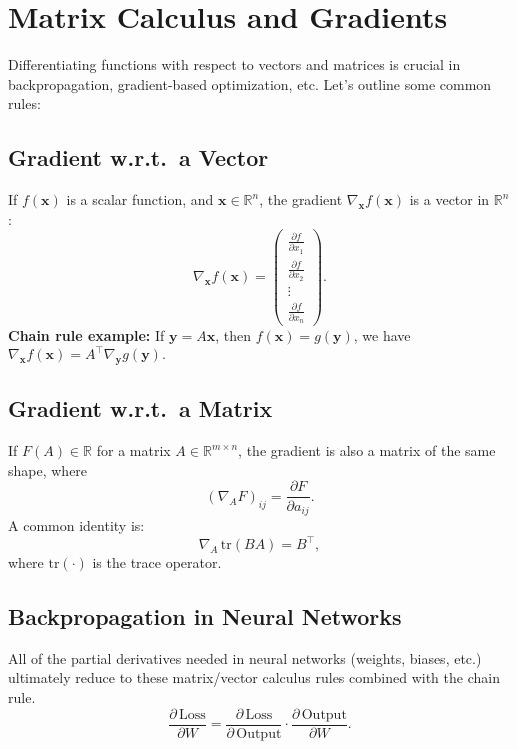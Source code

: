 \section{Matrix Calculus and Gradients}
Differentiating functions with respect to vectors and matrices is crucial in backpropagation, 
gradient-based optimization, etc. Let’s outline some common rules:

\subsection{Gradient w.r.t.\ a Vector}
If $f(\mathbf{x})$ is a scalar function, and $\mathbf{x} \in \mathbb{R}^n$, 
the gradient $\nabla_{\mathbf{x}} f(\mathbf{x})$ is a vector in $\mathbb{R}^n$:
\[
\nabla_{\mathbf{x}} f(\mathbf{x})
= \begin{pmatrix}
\frac{\partial f}{\partial x_1} \\
\frac{\partial f}{\partial x_2} \\
\vdots \\
\frac{\partial f}{\partial x_n}
\end{pmatrix}.
\]
\textbf{Chain rule example:} If $\mathbf{y} = A \mathbf{x}$, then $f(\mathbf{x}) = g(\mathbf{y})$, 
we have $\nabla_{\mathbf{x}} f(\mathbf{x}) = A^\top \nabla_{\mathbf{y}} g(\mathbf{y}).$

\subsection{Gradient w.r.t.\ a Matrix}
If $F(A) \in \mathbb{R}$ for a matrix $A \in \mathbb{R}^{m \times n}$, 
the gradient is also a matrix of the same shape, where
\[
(\nabla_A F)_{ij} = \frac{\partial F}{\partial a_{ij}}.
\]
A common identity is:
\[
\nabla_A \, \text{tr}(BA) = B^\top,
\]
where $\text{tr}(\cdot)$ is the trace operator. 

\subsection{Backpropagation in Neural Networks}
All of the partial derivatives needed in neural networks (weights, biases, etc.) 
ultimately reduce to these matrix/vector calculus rules combined with the chain rule. 
\[
\frac{\partial \, \text{Loss}}{\partial W} 
= \frac{\partial \, \text{Loss}}{\partial \, \text{Output}} 
\cdot \frac{\partial \, \text{Output}}{\partial W}.
\]











